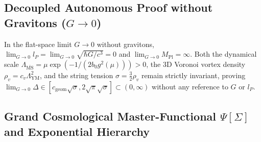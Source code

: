 \documentclass[11pt, a4paper]{article}
\theoremstyle{definition}
\theoremstyle{remark}
\begin{document}
\subsection{Decoupled Autonomous Proof without Gravitons ($G \to 0$)}

In the flat-space limit $G \to 0$ without gravitons, $\lim_{G \to 0} l_{P} = \lim_{G \to 0}\sqrt{\hbar G/c^{3}} = 0$ and $\lim_{G \to 0} M_{\mathrm{Pl}} = \infty$. Both the dynamical scale $\Lambda_{\overline{\mathrm{MS}}} = \mu\exp(-1/(2b_{0}g^{2}(\mu))) > 0$, the 3D Voronoi vortex density $\rho_{v} = c_{v}\Lambda_{\mathrm{YM}}^{2}$, and the string tension $\sigma = \frac{3}{2}\rho_{v}$ remain strictly invariant, proving $\lim_{G \to 0}\Delta \in [c_{\mathrm{geom}}\sqrt{\sigma}, 2\sqrt{\pi}\sqrt{\sigma}] \subset (0, \infty)$ without any reference to $G$ or $l_{P}$.

\subsection{Grand Cosmological Master-Functional $\Psi[\Sigma]$ and Exponential Hierarchy}
\end{document}
